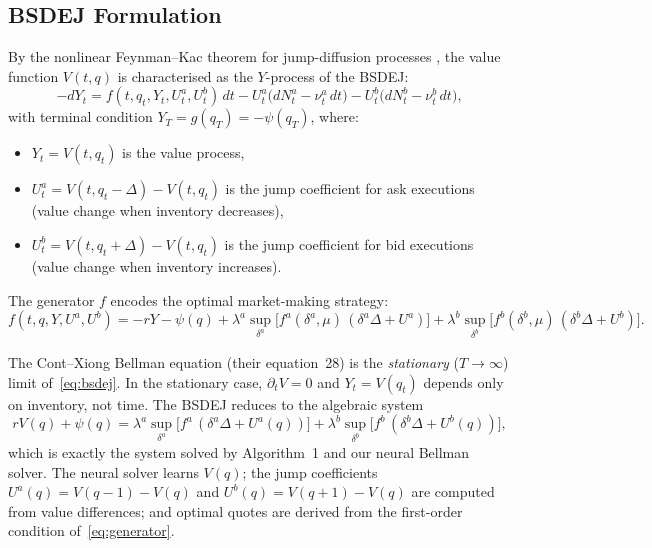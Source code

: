 \subsection{BSDEJ Formulation}

By the nonlinear Feynman--Kac theorem for jump-diffusion processes
\cite{barles1997}, the value function $V(t, q)$ is characterised as
the $Y$-process of the BSDEJ:
\begin{equation}\label{eq:bsdej}
  -dY_t = f(t, q_t, Y_t, U^a_t, U^b_t)\,dt
          - U^a_t \bigl(dN^a_t - \nu^a_t\,dt\bigr)
          - U^b_t \bigl(dN^b_t - \nu^b_t\,dt\bigr),
\end{equation}
with terminal condition $Y_T = g(q_T) = -\psi(q_T)$, where:
\begin{itemize}
  \item $Y_t = V(t, q_t)$ is the value process,
  \item $U^a_t = V(t, q_t - \Delta) - V(t, q_t)$ is the jump coefficient
        for ask executions (value change when inventory decreases),
  \item $U^b_t = V(t, q_t + \Delta) - V(t, q_t)$ is the jump coefficient
        for bid executions (value change when inventory increases).
\end{itemize}

The generator $f$ encodes the optimal market-making strategy:
\begin{equation}\label{eq:generator}
  f(t, q, Y, U^a, U^b) = -rY - \psi(q)
    + \lambda^a \sup_{\delta^a} \bigl[f^a(\delta^a, \mu)\,(\delta^a \Delta + U^a)\bigr]
    + \lambda^b \sup_{\delta^b} \bigl[f^b(\delta^b, \mu)\,(\delta^b \Delta + U^b)\bigr].
\end{equation}

\begin{remark}
The Cont--Xiong Bellman equation (their equation~28) is the
\emph{stationary} ($T \to \infty$) limit of~\eqref{eq:bsdej}. In the
stationary case, $\partial_t V = 0$ and $Y_t = V(q_t)$ depends only on
inventory, not time. The BSDEJ reduces to the algebraic system
\begin{equation}
  rV(q) + \psi(q) = \lambda^a \sup_{\delta^a}\bigl[f^a\,(\delta^a \Delta + U^a(q))\bigr]
                   + \lambda^b \sup_{\delta^b}\bigl[f^b\,(\delta^b \Delta + U^b(q))\bigr],
\end{equation}
which is exactly the system solved by Algorithm~1 and our neural
Bellman solver. The neural solver learns $V(q)$; the jump coefficients
$U^a(q) = V(q-1) - V(q)$ and $U^b(q) = V(q+1) - V(q)$ are computed
from value differences; and optimal quotes are derived from the
first-order condition of~\eqref{eq:generator}.
\end{remark}

